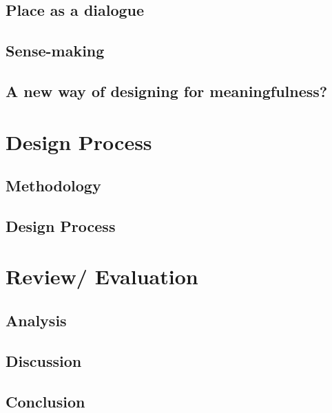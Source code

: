 \documentclass[UKenglish]{ifimaster}
\begin{document}
\chapter{Place as a dialogue}


\chapter{Sense-making}

\chapter{A new way of designing for meaningfulness?}


\part{Design Process}
\chapter{Methodology}

\chapter{Design Process}


\part{Review/ Evaluation }
\chapter{Analysis}



\chapter{Discussion}


\chapter{Conclusion}


\backmatter{}

\printbibliography[nottype=online]
\printbibliography[type=online,title={Web only}]
 


% 
\end{document}
